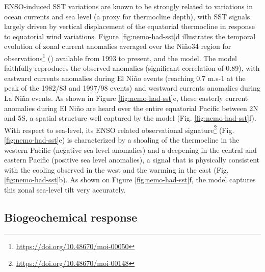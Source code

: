 ENSO-induced SST variations are known to be strongly related to variations in ocean currents and sea level (a proxy for thermocline depth), with SST signals largely driven by vertical displacement of the equatorial thermocline in response to equatorial wind variations. Figure \ref{fig:nemo-had-sst}d illustrates the temporal evolution of zonal current anomalies averaged over the Niño34 region for observations\footnote{\url{https://doi.org/10.48670/moi-00050}} (\citealp{rioGOCEOceanCirculation2014}) available from 1993 to present, and the model. The model faithfully reproduces the observed anomalies (significant correlation of 0.89), with eastward currents anomalies during El Niño events (reaching 0.7 m.s-1 at the peak of the 1982/83 and 1997/98 events) and westward currents anomalies during La Niña events. As shown in Figure \ref{fig:nemo-had-sst}e, these easterly current anomalies during El Niño are heard over the entire equatorial Pacific between 2N and 5S, a spatial structure well captured by the model (Fig. \ref{fig:nemo-had-sst}f).
With respect to sea-level, its ENSO related observational signature\footnote{\url{https://doi.org/10.48670/moi-00148}} (Fig. \ref{fig:nemo-had-sst}e) is characterized by a shoaling of the thermocline in the western Pacific (negative sea level anomalies) and a deepening in the central and eastern Pacific (positive sea level anomalies), a signal that is physically consistent with the cooling observed in the west and the warming in the east (Fig. \ref{fig:nemo-had-sst}b). As shown on Figure \ref{fig:nemo-had-sst}f, the model captures this zonal sea-level tilt very accurately.

\subsection{Biogeochemical response}

